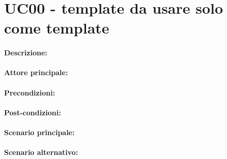 \section{UC00 - template da usare solo come template}

\paragraph{Descrizione:}

\paragraph{Attore principale:}


\paragraph{Precondizioni:}

\paragraph{Post-condizioni:}

\paragraph{Scenario principale:}

\paragraph{Scenario alternativo:}

